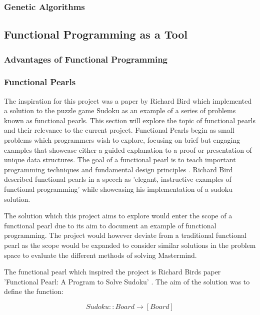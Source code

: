 \documentclass[12pt]{article}  %
\theoremstyle{definition}
\theoremstyle{remark}
\begin{document}
\subsubsection {Genetic Algorithms}


\subsection {Functional Programming as a Tool}

\subsubsection {Advantages of Functional Programming}

\subsubsection {Functional Pearls}
The inspiration for this project was a paper by Richard Bird which implemented a solution to the puzzle game Sudoku as an example of a series of problems known as functional pearls. This section will explore the topic of functional pearls and their relevance to the current project. Functional Pearls begin as small problems which programmers wish to explore, focusing on brief but engaging examples that showcase either a guided explanation to a proof or presentation of unique data structures. The goal of a functional pearl is to teach important programming techniques and fundamental design principles \cite{Pearls}. Richard Bird described functional pearls in a speech as 'elegant, instructive examples of functional programming' while showcasing his implementation of a sudoku solution\cite {R. Bird Speech}.


The solution which this project aims to explore would enter the scope of a functional pearl due to its aim to document an example of functional programming. The project would however deviate from a traditional functional pearl as the scope would be expanded to consider similar solutions in the problem space to evaluate the different methods of solving Mastermind.

The functional pearl which inspired the project is Richard Birds paper 'Functional Pearl: A Program to Solve Sudoku' \cite{Sudoku}. The aim of the solution was to define the function:

\[ Sudoku :: Board \rightarrow [Board]\]
\end{document}
